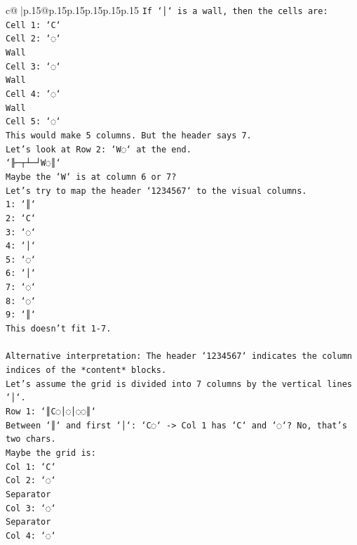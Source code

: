 \documentclass{article}
\begin{document}
{\begin{supertabular}{c@{$\;$}|p{.15\linewidth}@{}p{.15\linewidth}p{.15\linewidth}p{.15\linewidth}p{.15\linewidth}p{.15\linewidth}}
{{{\texttt{If `│` is a wall, then the cells are:} \\
\texttt{Cell 1: `C`} \\
\texttt{Cell 2: `◌`} \\
\texttt{Wall} \\
\texttt{Cell 3: `◌`} \\
\texttt{Wall} \\
\texttt{Cell 4: `◌`} \\
\texttt{Wall} \\
\texttt{Cell 5: `◌`} \\
\texttt{This would make 5 columns. But the header says 7.} \\
\texttt{Let's look at Row 2: `W◌` at the end.} \\
\texttt{`╟─┬┴─┘W◌║`} \\
\texttt{Maybe the `W` is at column 6 or 7?} \\
\texttt{Let's try to map the header `1234567` to the visual columns.} \\
\texttt{1: `║`} \\
\texttt{2: `C`} \\
\texttt{3: `◌`} \\
\texttt{4: `│`} \\
\texttt{5: `◌`} \\
\texttt{6: `│`} \\
\texttt{7: `◌`} \\
\texttt{8: `◌`} \\
\texttt{9: `║`} \\
\texttt{This doesn't fit 1{-}7.} \\
\\ 
\texttt{Alternative interpretation: The header `1234567` indicates the column indices of the *content* blocks.} \\
\texttt{Let's assume the grid is divided into 7 columns by the vertical lines `│`.} \\
\texttt{Row 1: `║C◌│◌│◌◌║`} \\
\texttt{Between `║` and first `│`: `C◌` {-}> Col 1 has `C` and `◌`? No, that's two chars.} \\
\texttt{Maybe the grid is:} \\
\texttt{Col 1: `C`} \\
\texttt{Col 2: `◌`} \\
\texttt{Separator} \\
\texttt{Col 3: `◌`} \\
\texttt{Separator} \\
\texttt{Col 4: `◌`} \\
}}}
\end{supertabular}}
\end{document}
